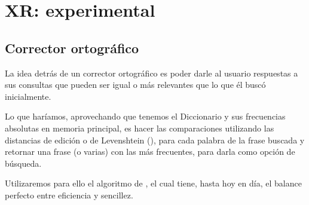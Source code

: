\section{XR: experimental}

\subsection{Corrector ortográfico}

La idea detrás de un corrector ortográfico es poder darle al usuario respuestas a sus consultas que pueden ser igual o más relevantes que lo que él buscó inicialmente. 


Lo que haríamos, aprovechando que tenemos el Diccionario y sus frecuencias absolutas en memoria principal, es hacer las comparaciones utilizando las distancias de edición o de Levenshtein (\citet[p.~58]{Manning:2008}), para cada palabra de la frase buscada y retornar una frase (o varias) con las más frecuentes, para darla como opción de búsqueda.

Utilizaremos para ello el algoritmo de \citeauthor{norvigSP}, el cual tiene, hasta hoy en día, el balance perfecto entre eficiencia y sencillez.